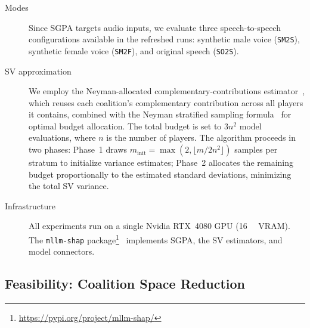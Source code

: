 \documentclass[cameraready]{Interspeech}
\begin{document}
\begin{description}
  \item[Modes] Since SGPA targets audio inputs, we evaluate three speech-to-speech configurations available in the refreshed runs: synthetic male voice (\texttt{SM2S}), synthetic female voice (\texttt{SM2F}), and original speech (\texttt{SO2S}).

  \item[SV approximation] We employ the Neyman-allocated complementary-contributions estimator~\cite{shapleyapproximations}, which reuses each coalition's complementary contribution across all players it contains, combined with the Neyman stratified sampling formula~\cite{nayman} for optimal budget allocation. The total budget is set to $3n^2$ model evaluations, where $n$ is the number of players. The algorithm proceeds in two phases: Phase~1 draws $m_{\mathrm{init}} = \max(2, \lfloor m / 2n^2 \rfloor)$ samples per stratum to initialize variance estimates; Phase~2 allocates the remaining budget proportionally to the estimated standard deviations, minimizing the total SV variance.

  \item[Infrastructure] All experiments run on a single Nvidia RTX~4080 GPU (\SI{16}{\giga\byte} VRAM). The \texttt{mllm-shap} package\footnote{\url{https://pypi.org/project/mllm-shap/}}~\cite{pozorskimuszynskimllmshap} implements SGPA, the SV estimators, and model connectors.
\end{description}

\subsection{Feasibility: Coalition Space Reduction}
\label{subsec:feasibility}
\end{document}

